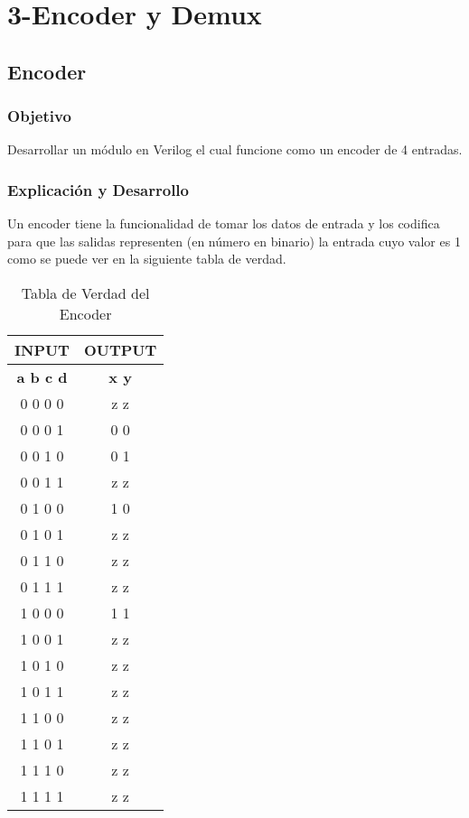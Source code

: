 \chapter*{3-Encoder y Demux}
\section{Encoder}
\subsection{Objetivo}
Desarrollar un m\'odulo en Verilog el cual funcione como un encoder de 4 entradas.
\subsection{Explicaci\'on y Desarrollo}
Un encoder tiene la funcionalidad de tomar los datos de entrada y los codifica para que las salidas
representen (en n\'umero en binario) la entrada cuyo valor es 1 como se puede ver en la siguiente tabla de verdad.
\begin{center}
	\begin{table}[h!]
		\begin{center}
			\caption{Tabla de Verdad del Encoder}
			\begin{tabular}{|c|c|}
				\hline
				\textbf{INPUT} & \textbf{OUTPUT} \\
				\hline
				\textbf{a b c d} & \textbf{x y} \\
				\hline
				0 0 0 0 & z z\\
				\hline
				0 0 0 1 & 0 0 \\
				\hline
				0 0 1 0 & 0 1\\
				\hline
				0 0 1 1 & z z\\
				\hline
				0 1 0 0 & 1 0\\
				\hline
				0 1 0 1 & z z\\
				\hline
				0 1 1 0 & z z\\
				\hline
				0 1 1 1 & z z\\
				\hline
				1 0 0 0 & 1 1\\
				\hline
				1 0 0 1 & z z\\
				\hline
				1 0 1 0 & z z\\
				\hline
				1 0 1 1 & z z\\
				\hline
				1 1 0 0 & z z\\
				\hline
				1 1 0 1 & z z\\
				\hline
				1 1 1 0 & z z\\
				\hline
				1 1 1 1 & z z\\
				\hline
			\end{tabular} \\
		\end{center}
	\end{table}
\end{center}
